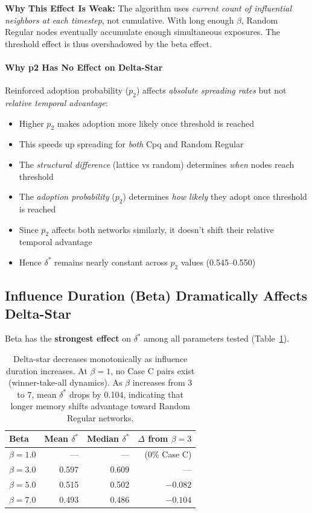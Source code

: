 \documentclass[12pt,a4paper]{article}
\begin{document}
\textbf{Why This Effect Is Weak:}
The algorithm uses \textit{current count of influential neighbors at each timestep}, not cumulative. With long enough $\beta$, Random Regular nodes eventually accumulate enough simultaneous exposures. The threshold effect is thus overshadowed by the beta effect.

\paragraph{Why p2 Has No Effect on Delta-Star}

Reinforced adoption probability ($p_2$) affects \textit{absolute spreading rates} but not \textit{relative temporal advantage}:
\begin{itemize}
    \item Higher $p_2$ makes adoption more likely once threshold is reached
    \item This speeds up spreading for \textit{both} Cpq and Random Regular
    \item The \textit{structural difference} (lattice vs random) determines \textit{when} nodes reach threshold
    \item The \textit{adoption probability} ($p_2$) determines \textit{how likely} they adopt once threshold is reached
    \item Since $p_2$ affects both networks similarly, it doesn't shift their relative temporal advantage
    \item Hence $\delta^*$ remains nearly constant across $p_2$ values (0.545--0.550)
\end{itemize}

\subsection{Influence Duration (Beta) Dramatically Affects Delta-Star}

Beta has the \textbf{strongest effect} on $\delta^*$ among all parameters tested (Table~\ref{tab:deltastar_by_beta}).

\begin{table}[H]
\centering
\begin{tabular}{@{}lrrr@{}}
\toprule
\textbf{Beta} & \textbf{Mean $\delta^*$} & \textbf{Median $\delta^*$} & \textbf{$\Delta$ from $\beta=3$} \\
\midrule
$\beta = 1.0$ & --- & --- & (0\% Case C) \\
$\beta = 3.0$ & 0.597 & 0.609 & --- \\
$\beta = 5.0$ & 0.515 & 0.502 & $-0.082$ \\
$\beta = 7.0$ & 0.493 & 0.486 & $-0.104$ \\
\bottomrule
\end{tabular}
\caption{Delta-star decreases monotonically as influence duration increases. At $\beta=1$, no Case C pairs exist (winner-take-all dynamics). As $\beta$ increases from 3 to 7, mean $\delta^*$ drops by 0.104, indicating that longer memory shifts advantage toward Random Regular networks.}
\label{tab:deltastar_by_beta}
\end{table}
\end{document}
